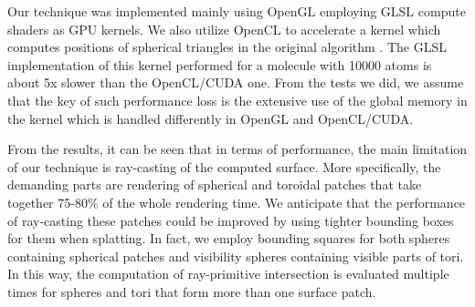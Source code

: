 Our technique was implemented mainly using OpenGL employing GLSL compute shaders as GPU kernels.
We also utilize OpenCL to accelerate a kernel which computes positions of spherical triangles in the original algorithm \cite{krone2011parallel}.
The GLSL implementation of this kernel performed for a molecule with {\tweakedsim}10000 atoms is about 5x slower than the OpenCL/CUDA one.
From the tests we did, we assume that the key of such performance loss is the extensive use of the global memory in the kernel which is handled differently in OpenGL and OpenCL/CUDA.

From the results, it can be seen that in terms of performance, the main limitation of our technique is ray-casting of the computed surface.
More specifically, the demanding parts are rendering of spherical and toroidal patches that take together 75-80\% of the whole rendering time.
We anticipate that the performance of ray-casting these patches could be improved by using tighter bounding boxes for them when splatting.
In fact, we employ bounding squares for both spheres containing spherical patches and visibility spheres containing visible parts of tori.
In this way, the computation of ray-primitive intersection is evaluated multiple times for spheres and tori that form more than one surface patch.